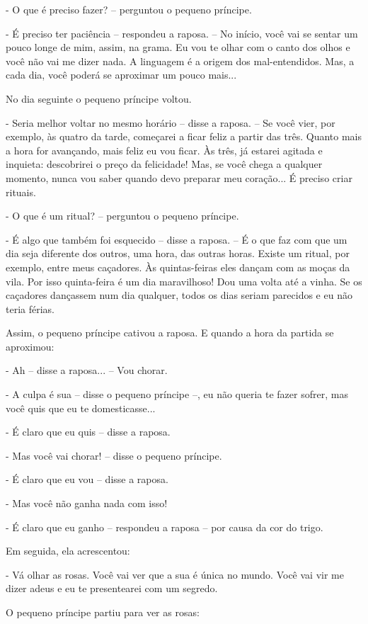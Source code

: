- O que é preciso fazer? -- perguntou o pequeno príncipe.

- É preciso ter paciência -- respondeu a raposa. -- No início, você vai
se sentar um pouco longe de mim, assim, na grama. Eu vou te olhar com o
canto dos olhos e você não vai me dizer nada. A linguagem é a origem dos
mal-entendidos. Mas, a cada dia, você poderá se aproximar um pouco
mais...

No dia seguinte o pequeno príncipe voltou.

- Seria melhor voltar no mesmo horário -- disse a raposa. -- Se você
vier, por exemplo, às quatro da tarde, começarei a ficar feliz a partir
das três. Quanto mais a hora for avançando, mais feliz eu vou ficar. Às
três, já estarei agitada e inquieta: descobrirei o preço da felicidade!
Mas, se você chega a qualquer momento, nunca vou saber quando devo
preparar meu coração... É preciso criar rituais.

- O que é um ritual? -- perguntou o pequeno príncipe.

- É algo que também foi esquecido -- disse a raposa. -- É o que faz com
que um dia seja diferente dos outros, uma hora, das outras horas. Existe
um ritual, por exemplo, entre meus caçadores. Às quintas-feiras eles
dançam com as moças da vila. Por isso quinta-feira é um dia maravilhoso!
Dou uma volta até a vinha. Se os caçadores dançassem num dia qualquer,
todos os dias seriam parecidos e eu não teria férias.

Assim, o pequeno príncipe cativou a raposa. E quando a hora da partida
se aproximou:

- Ah -- disse a raposa... -- Vou chorar.

- A culpa é sua -- disse o pequeno príncipe --, eu não queria te fazer
sofrer, mas você quis que eu te domesticasse...

- É claro que eu quis -- disse a raposa.

- Mas você vai chorar! -- disse o pequeno príncipe.

- É claro que eu vou -- disse a raposa.

- Mas você não ganha nada com isso!

- É claro que eu ganho -- respondeu a raposa -- por causa da cor do
trigo.

Em seguida, ela acrescentou:

- Vá olhar as rosas. Você vai ver que a sua é única no mundo. Você vai
vir me dizer adeus e eu te presentearei com um segredo.

O pequeno príncipe partiu para ver as rosas:

